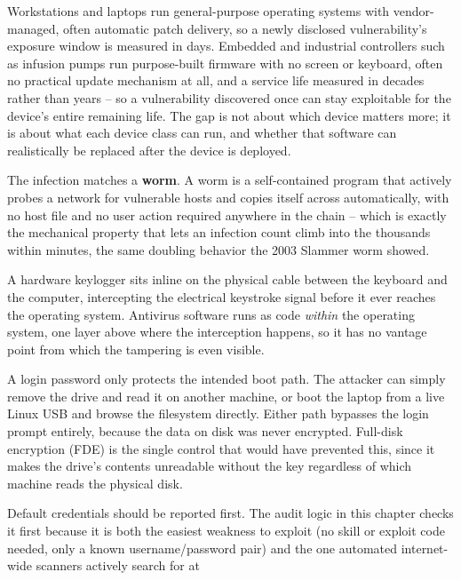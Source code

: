\begin{answerkey}
\item Workstations and laptops run general-purpose operating systems with vendor-managed, often
automatic patch delivery, so a newly disclosed vulnerability's exposure window is measured in
days. Embedded and industrial controllers such as infusion pumps run purpose-built firmware with
no screen or keyboard, often no practical update mechanism at all, and a service life measured in
decades rather than years -- so a vulnerability discovered once can stay exploitable for the
device's entire remaining life. The gap is not about which device matters more; it is about what
each device class can run, and whether that software can realistically be replaced after the
device is deployed.
\item The infection matches a \textbf{worm}. A worm is a self-contained program that actively
probes a network for vulnerable hosts and copies itself across automatically, with no host file and
no user action required anywhere in the chain -- which is exactly the mechanical property that lets
an infection count climb into the thousands within minutes, the same doubling behavior the 2003
Slammer worm showed.
\item A hardware keylogger sits inline on the physical cable between the keyboard and the
computer, intercepting the electrical keystroke signal before it ever reaches the operating system.
Antivirus software runs as code \emph{within} the operating system, one layer above where the
interception happens, so it has no vantage point from which the tampering is even visible.
\item A login password only protects the intended boot path. The attacker can simply remove the
drive and read it on another machine, or boot the laptop from a live Linux USB and browse the
filesystem directly. Either path bypasses the login prompt entirely, because the data on disk was
never encrypted. Full-disk encryption (FDE) is the single control that would have prevented this, since it
makes the drive's contents unreadable without the key regardless of which machine reads the physical
disk.
\item Default credentials should be reported first. The audit logic in this chapter checks it
first because it is both the easiest weakness to exploit (no skill or exploit code needed, only a
known username/password pair) and the one automated internet-wide scanners actively search for at

\end{answerkey}
